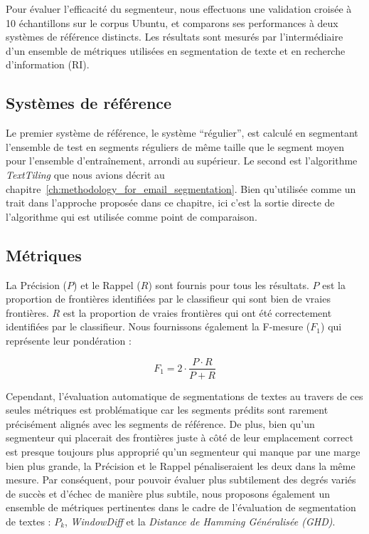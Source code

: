 Pour évaluer l'efficacité du segmenteur, nous effectuons une validation croisée à 10 échantillons sur le corpus Ubuntu, et comparons ses performances à deux systèmes de référence distincts. Les résultats sont mesurés par l'intermédiaire d'un ensemble de métriques utilisées en segmentation de texte et en recherche d'information (RI).

\subsection{Systèmes de référence}

Le premier système de référence, le système ``régulier'', est calculé en segmentant l'ensemble de test en segments réguliers de même taille que le segment moyen pour l'ensemble d'entraînement, arrondi au supérieur. Le second est l'algorithme \textit{TextTiling} que nous avions décrit au chapitre~\ref{ch:methodology_for_email_segmentation}. Bien qu'utilisée comme un trait dans l'approche proposée dans ce chapitre, ici c'est la sortie directe de l'algorithme qui est utilisée comme point de comparaison.

\subsection{Métriques}

La Précision ($P$) et le Rappel ($R$) sont fournis pour tous les résultats. $P$ est la proportion de frontières identifiées par le classifieur qui sont bien de vraies frontières. $R$ est la proportion de vraies frontières qui ont été correctement identifiées par le classifieur. Nous fournissons également la F-mesure ($F_1$) qui représente leur pondération :

\[
F_1 = 2 \cdot \frac{P \cdot R}{P + R}
\]

Cependant, l'évaluation automatique de segmentations de textes au travers de ces seules métriques est problématique car les segments prédits sont rarement précisément alignés avec les segments de référence. De plus, bien qu'un segmenteur qui placerait des frontières juste à côté de leur emplacement correct est presque toujours plus approprié qu'un segmenteur qui manque par une marge bien plus grande, la Précision et le Rappel pénaliseraient les deux dans la même mesure. Par conséquent, pour pouvoir évaluer plus subtilement des degrés variés de succès et d'échec de manière plus subtile, nous proposons également un ensemble de métriques pertinentes dans le cadre de l'évaluation de segmentation de textes : ${P_{k}}$, \textit{WindowDiff} et la \textit{Distance de Hamming Généralisée (GHD)}.

